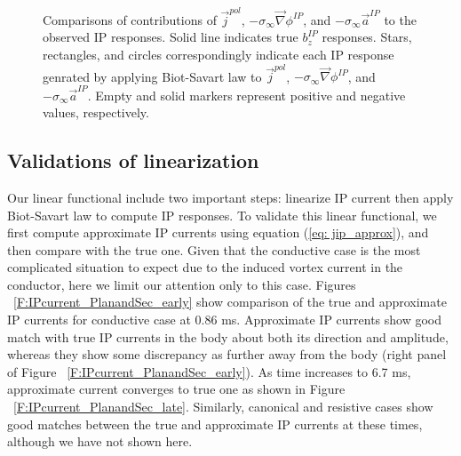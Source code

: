 \documentclass[extra,mreferee]{gji}
\newcommand{\grad}{\vec \nabla}
\newcommand{\siginf}{\sigma_\infty}
\renewcommand {\j}  { {\vec j} }
\begin{document}
\begin{figure}
  \caption{Comparisons of contributions of $\j^{pol}$, $-\siginf\grad \phi^{IP}$, and $-\siginf\vec{a}^{IP}$ to the observed IP responses. Solid line indicates true $b_z^{IP}$ responses. Stars, rectangles, and circles correspondingly indicate each IP response genrated by applying Biot-Savart law to $\j^{pol}$, $-\siginf\grad \phi^{IP}$, and $-\siginf\vec{a}^{IP}$. Empty and solid markers represent positive and negative values, respectively. }
  \label{F:DecompjIPcond}
\end{figure}
\clearpage

\subsection{Validations of linearization}
Our linear functional include two important steps: linearize IP current then apply Biot-Savart law to compute IP responses.
To validate this linear functional, we first compute approximate IP currents using equation (\ref{eq: jip_approx}), and then compare with the true one.
Given that the conductive case is the most complicated situation to expect due to the induced vortex current in the conductor, here we limit our attention only to this case.
Figures ~\ref{F:IPcurrent_PlanandSec_early} show comparison of the true and approximate IP currents for conductive case at 0.86 ms. 
Approximate IP currents show good match with true IP currents in the body about both its direction and amplitude, whereas they show some discrepancy as further away from the body (right panel of Figure ~\ref{F:IPcurrent_PlanandSec_early}).
As time increases to 6.7 ms, approximate current converges to true one as shown in Figure ~\ref{F:IPcurrent_PlanandSec_late}. Similarly, canonical and resistive cases show good matches between the true and approximate IP currents at these times, although we have not shown here. 
\end{document}
